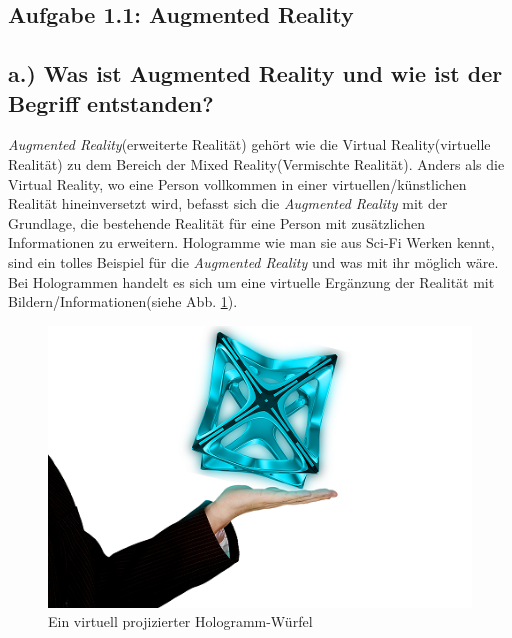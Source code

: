 \documentclass[12pt,utf8]{scrartcl}
\begin{document}
\thispagestyle{empty}
\tableofcontents
\newpage
\begin{flushleft}
\setcounter{page}{1}

\section*{\label{sec:thema}Aufgabe 1.1: Augmented Reality}
\subsection*{\label{sub:thema}a.) Was ist Augmented Reality und wie ist der Begriff entstanden?}

\textit{Augmented Reality}(erweiterte Realität) gehört wie die Virtual Reality(virtuelle Realität) zu dem Bereich der Mixed Reality(Vermischte Realität). Anders als die Virtual Reality, wo eine Person vollkommen in einer virtuellen/künstlichen Realität hineinversetzt wird, befasst sich die \textit{Augmented Reality} mit der Grundlage, die bestehende Realität für eine Person mit zusätzlichen Informationen zu erweitern\cite{PaulMilgram}. Hologramme wie man sie aus Sci-Fi Werken kennt, sind ein tolles Beispiel für die \textit{Augmented Reality} und was mit ihr möglich wäre. Bei Hologrammen handelt es sich um eine virtuelle Ergänzung der Realität mit Bildern/Informationen(siehe Abb. \ref{fig:hologram}). 
\linebreak

\begin{figure}[H]
	\centering
	\includegraphics[width=0.8\linewidth]{images/hologram}
	\caption{Ein virtuell projizierter Hologramm-Würfel\cite{online4}}
	\label{fig:hologram}
\end{figure}



\end{flushleft}
\end{document}
